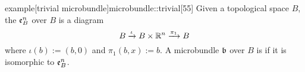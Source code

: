 \begin{mystatement}{example}[trivial microbundle]{microbundle::trivial}[55]
    Given a topological space $B$, the  $\mathfrak{e}^{n}_{B}$ over $B$ is a diagram
    \[ B \xrightarrow{\iota} B \times \mathbb{R}^n \xrightarrow{\pi_1} B{} \]
    where $\iota(b) := (b, 0)$ and $\pi_1(b, x) := b$.
    A microbundle $\bb$ over $B$ is  if it is isomorphic to $\mathfrak{e}^{n}_{B}$.
\end{mystatement}